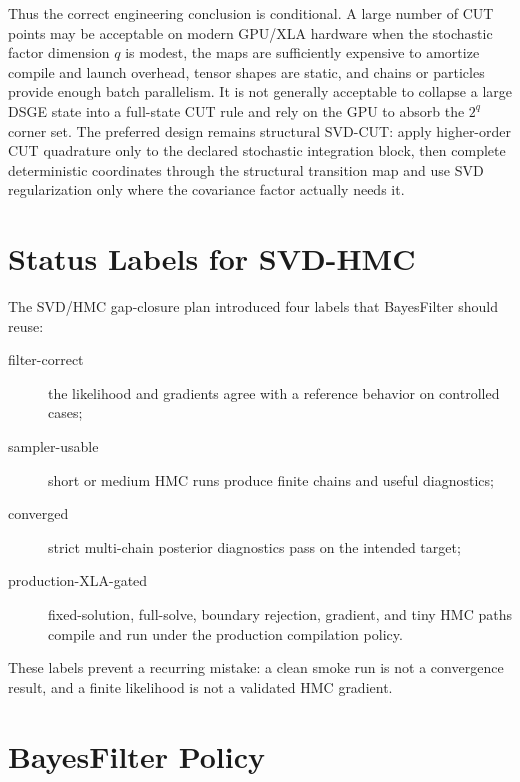 Thus the correct engineering conclusion is conditional.  A large number of
CUT points may be acceptable on modern GPU/XLA hardware when the stochastic
factor dimension $q$ is modest, the maps are sufficiently expensive to amortize
compile and launch overhead, tensor shapes are static, and chains or particles
provide enough batch parallelism.  It is not generally acceptable to collapse a
large DSGE state into a full-state CUT rule and rely on the GPU to absorb the
$2^q$ corner set.  The preferred design remains structural SVD-CUT: apply
higher-order CUT quadrature only to the declared stochastic integration block,
then complete deterministic coordinates through the structural transition map
and use SVD regularization only where the covariance factor actually needs it.

\section{Status Labels for SVD-HMC}
\label{sec:bf-svd-status-labels}

The SVD/HMC gap-closure plan introduced four labels that BayesFilter should
reuse:
\begin{description}
  \item[filter-correct] the likelihood and gradients agree with a reference
    behavior on controlled cases;
  \item[sampler-usable] short or medium HMC runs produce finite chains and
    useful diagnostics;
  \item[converged] strict multi-chain posterior diagnostics pass on the
    intended target;
  \item[production-XLA-gated] fixed-solution, full-solve, boundary rejection,
    gradient, and tiny HMC paths compile and run under the production
    compilation policy.
\end{description}
These labels prevent a recurring mistake: a clean smoke run is not a
convergence result, and a finite likelihood is not a validated HMC gradient.

\section{BayesFilter Policy}
\label{sec:bf-svd-policy}

